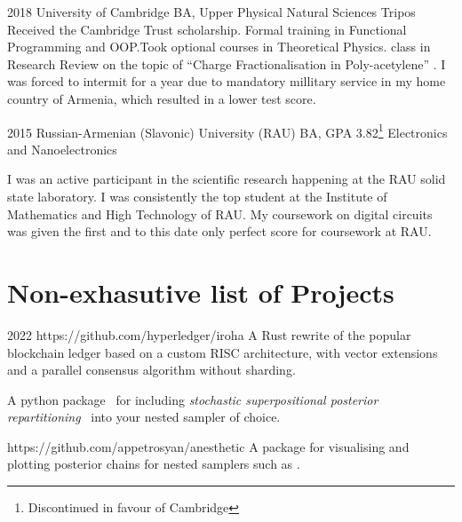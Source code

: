 \documentclass{CurriculumVitae}[10pt, condensed]
\begin{document}
{%
          {2018}%
          {University of Cambridge}%
          {BA, Upper }%
          {Physical Natural Sciences Tripos}%
          {
            Received the Cambridge Trust scholarship. Formal training
            in Functional Programming and OOP.\@ Took optional courses
            in Theoretical Physics.  class in Research Review
            on the topic of ``Charge Fractionalisation in Poly-acetylene''%
            \cite{charge-frac}. I was forced to intermit for a year due to
            mandatory millitary service in my home country of Armenia,
            which resulted in a lower test score.
          }

%
          {2015}%
          {Russian-Armenian (Slavonic) University (RAU)}
          {BA, GPA 3.82\footnote{Discontinued in favour of Cambridge}}%
          {Electronics and Nanoelectronics}%
          {%

            I was an active participant\cite{cu2o,measurement} in the
            scientific research happening at the RAU solid state
            laboratory.  I was consistently the top student at the
            Institute of Mathematics and High Technology of RAU.  My
            coursework on digital circuits was given the first and to
            this date only perfect score for coursework at RAU.
          }%

\vfill
\section*{Non-exhasutive list of Projects}%
%
%
        {2022}%
        {https://github.com/hyperledger/iroha}
        {
          A Rust rewrite of the popular blockchain ledger based on a custom
          RISC architecture, with vector extensions and a parallel consensus
          algorithm without sharding.
        }





   {A
    python package~\cite{sspr-mdpi} for including \emph{stochastic
      superpositional posterior repartitioning}~\cite{sspr} into your
    nested sampler of choice.
  }

   {https://github.com/appetrosyan/anesthetic}
  {A package for visualising and plotting posterior chains for nested
    samplers such as .
  }

}
\vfill
\end{document}
